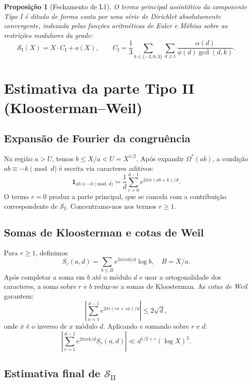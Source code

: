 \documentclass[12pt]{article}
\newtheorem{proposicao}[teorema]{Proposição}
\theoremstyle{definition}
\theoremstyle{remark}
\newcommand{\Omstar}{\Omega^*}
\newcommand{\SI}{\mathcal{S}_{\mathrm{I}}}
\newcommand{\SII}{\mathcal{S}_{\mathrm{II}}}
\begin{document}
	\begin{proposicao}[Fechamento de L1]\label{prop:L1_fechado}
		O termo principal assintótico da componente Tipo I é ditado de forma exata por uma série de Dirichlet absolutamente convergente, indexada pelas funções aritméticas de Euler e Möbius sobre as restrições modulares da grade:
		\[
		\SI(X) = X \cdot C_{\mathrm{I}} + o(X), \qquad C_{\mathrm{I}} = \frac{1}{3} \sum_{k \in \{-3,0,3\}} \sum_{d \ge 1} \frac{\alpha(d)}{\phi(d) \gcd(d,k)}.
		\]
	\end{proposicao}
	
	\section{Estimativa da parte Tipo II (Kloosterman–Weil)}
	\label{sec:tipoII}
	
	\subsection{Expansão de Fourier da congruência}
	
	Na região $a>U$, temos $b\le X/a<U=X^{1/2}$.
	Após expandir $\Omstar(ab)$, a condição $ab\equiv-k\pmod{d}$ é escrita via caracteres
	aditivos:
	\[
	\mathbf{1}_{ab\equiv-k\pmod{d}}
	=\frac{1}{d}\sum_{r=0}^{d-1}e^{2\pi ir(ab+k)/d}.
	\]
	O termo $r=0$ produz a parte principal, que se cancela com a contribuição
	correspondente de $\SI$. Concentramo-nos nos termos $r\ge1$.
	
	\subsection{Somas de Kloosterman e cotas de Weil}
	
	Para $r\ge1$, definimos
	\[
	S_r(a,d)=\sum_{b\le B}e^{2\pi irab/d}\log b,\quad B=X/a.
	\]
	Após completar a soma em $b$ até o módulo $d$ e usar a ortogonalidade
	dos caracteres, a soma sobre $r$ e $b$ reduz-se a somas de Kloosterman.
	As \emph{cotas de Weil} \cite{deshouillersiwaniec} garantem:
	\[
	\left|\sum_{x=1}^{d-1}e^{2\pi i(rx+s\bar{x})/d}\right|\le 2\sqrt{d},
	\]
	onde $\bar{x}$ é o inverso de $x$ módulo $d$.
	Aplicando e somando sobre $r$ e $d$:
	\[
	\left|\sum_{r=1}^{d-1}e^{2\pi irk/d}S_r(a,d)\right|
	\ll d^{1/2+\varepsilon}(\log X)^2.
	\]
	
	\subsection{Estimativa final de $\SII$}
	
\end{document}
